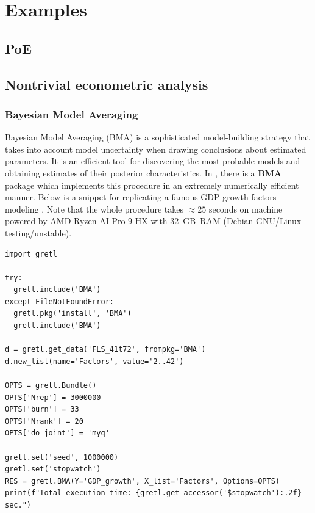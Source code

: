 \chapter{Examples}\label{sec:examples}
\section{PoE}

\section{Nontrivial econometric analysis}
\subsection{Bayesian Model Averaging}\label{sec.bma}
Bayesian Model Averaging (BMA) is a sophisticated
model-building strategy that takes into account model
uncertainty when drawing conclusions about estimated parameters.
It is an efficient tool for discovering the most probable
models and obtaining estimates of their posterior
characteristics. In \gretl, there is a \textbf{BMA} package
which implements this procedure in an extremely numerically
efficient manner. Below is a snippet for replicating
a famous GDP growth factors modeling
\cite[see][for details]{FernandezLeySteel2001_JoE,
	FernandezLeySteel2001_JoAE,Steel2020,BlazejowskiKwiatkowski_BMA_JSS}.
Note that the whole procedure takes $\approx 25$ seconds
on machine powered by AMD Ryzen AI Pro 9 HX with 32~GB~RAM
(Debian GNU/Linux testing/unstable).
\begin{lstlisting}[style=pythonstylefoot]
import gretl

try:
  gretl.include('BMA')
except FileNotFoundError:
  gretl.pkg('install', 'BMA')
  gretl.include('BMA')

d = gretl.get_data('FLS_41t72', frompkg='BMA')
d.new_list(name='Factors', value='2..42')

OPTS = gretl.Bundle()
OPTS['Nrep'] = 3000000
OPTS['burn'] = 33
OPTS['Nrank'] = 20
OPTS['do_joint'] = 'myq'

gretl.set('seed', 1000000)
gretl.set('stopwatch')
RES = gretl.BMA(Y='GDP_growth', X_list='Factors', Options=OPTS)
print(f"Total execution time: {gretl.get_accessor('$stopwatch'):.2f} sec.")
\end{lstlisting}


